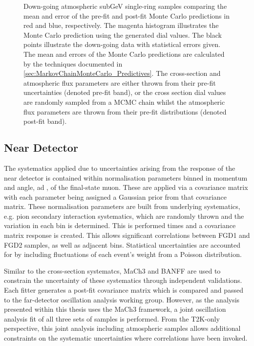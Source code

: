 \begin{figure}[h]
\begin{subfigure}[t]{0.49\textwidth}
  \end{subfigure}
  \caption{Down-going atmospheric subGeV single-ring samples comparing the mean and error of the pre-fit and post-fit Monte Carlo predictions in red and blue, respectively. The magenta histogram illustrates the Monte Carlo prediction using the generated dial values. The black points illustrate the down-going data with statistical errors given. The mean and errors of the Monte Carlo predictions are calculated by the techniques documented in \autoref{sec:MarkovChainMonteCarlo_Predictives}. The cross-section and atmospheric flux parameters are either thrown from their pre-fit uncertainties (denoted pre-fit band), or the cross section dial values are randomly sampled from a MCMC chain whilst the atmospheric flux parameters are thrown from their pre-fit distributions (denoted post-fit band).}
  \label{fig:SelsAndSysts_DownGoingPredictives}
\end{figure}

\subsection{Near Detector}
\label{sec:SelsAndSysts_Systs_ND}

The systematics applied due to uncertainties arising from the response of the near detector is contained within  normalisation parameters binned in momentum and angle,  ad \quickmath{\cos(\theta_{\mu})}, of the final-state muon. These are applied via a covariance matrix with each parameter being assigned a Gaussian prior from that covariance matrix. These normalisation parameters are built from underlying systematics, e.g. pion secondary interaction systematics, which are randomly thrown and the variation in each  bin is determined. This is performed  times and a covariance matrix response is created. This allows significant correlations between FGD1 and FGD2 samples, as well as adjacent bins. Statistical uncertainties are accounted for by including fluctuations of each event's weight from a Poisson distribution.

Similar to the cross-section systematcs, MaCh3 and BANFF are used to constrain the uncertainty of these systematics through independent validations. Each fitter generates a post-fit covariance matrix which is compared and passed to the far-detector oscillation analysis working group. However, as the analysis presented within this thesis uses the MaCh3 framework, a joint oscillation analysis fit of all three sets of samples is performed. From the T2K-only perspective, this joint analysis including atmospheric samples allows additional constraints on the systematic uncertainties where correlations have been invoked. 

